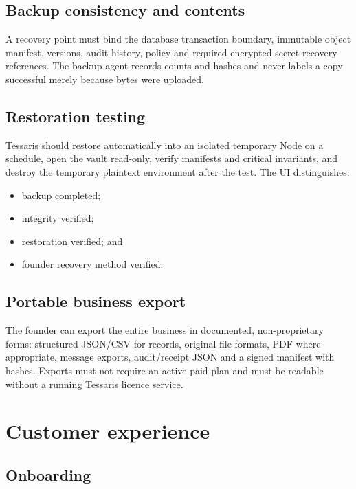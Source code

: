 \documentclass[11pt]{article}
\begin{document}
\subsection{Backup consistency and contents}

A recovery point must bind the database transaction boundary, immutable object manifest, versions, audit history, policy and required encrypted secret-recovery references. The backup agent records counts and hashes and never labels a copy successful merely because bytes were uploaded.

\subsection{Restoration testing}

Tessaris should restore automatically into an isolated temporary Node on a schedule, open the vault read-only, verify manifests and critical invariants, and destroy the temporary plaintext environment after the test. The UI distinguishes:

\begin{itemize}
  \item backup completed;
  \item integrity verified;
  \item restoration verified; and
  \item founder recovery method verified.
\end{itemize}

\subsection{Portable business export}

The founder can export the entire business in documented, non-proprietary forms: structured JSON/CSV for records, original file formats, PDF where appropriate, message exports, audit/receipt JSON and a signed manifest with hashes. Exports must not require an active paid plan and must be readable without a running Tessaris licence service.

\section{Customer experience}

\subsection{Onboarding}
\end{document}
